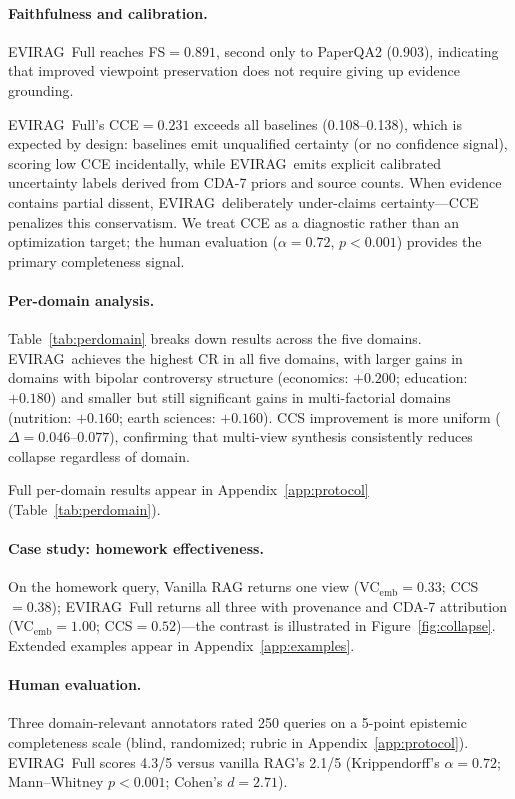 \documentclass[11pt]{article}
\newcommand{\system}{\textsc{EVIRAG}\xspace}
\begin{document}
\paragraph{Faithfulness and calibration.}
\system\ Full reaches FS$=0.891$, second only to PaperQA2 (0.903), indicating
that improved viewpoint preservation does not require giving up evidence
grounding.

\system\ Full's CCE$=0.231$ exceeds all baselines (0.108--0.138), which is
expected by design: baselines emit unqualified certainty (or no confidence
signal), scoring low CCE incidentally, while \system\ emits explicit calibrated
uncertainty labels derived from CDA-7 priors and source counts.  When evidence
contains partial dissent, \system\ deliberately under-claims certainty---CCE
penalizes this conservatism.  We treat CCE as a diagnostic rather than an
optimization target; the human evaluation ($\alpha{=}0.72$, $p{<}0.001$)
provides the primary completeness signal.

\paragraph{Per-domain analysis.}
Table~\ref{tab:perdomain} breaks down results across the five domains.
\system\ achieves the highest CR in all five domains, with larger gains in
domains with bipolar controversy structure (economics: $+0.200$;
education: $+0.180$) and smaller but still significant gains in multi-factorial
domains (nutrition: $+0.160$; earth sciences: $+0.160$).  CCS improvement is
more uniform ($\Delta{=}0.046$--$0.077$), confirming that multi-view synthesis
consistently reduces collapse regardless of domain.

Full per-domain results appear in Appendix~\ref{app:protocol}
(Table~\ref{tab:perdomain}).

\paragraph{Case study: homework effectiveness.}
On the homework query, Vanilla RAG returns one view
(VC$_\text{emb}{=}0.33$; CCS$=0.38$); \system\ Full returns all three with
provenance and CDA-7 attribution (VC$_\text{emb}{=}1.00$; CCS$=0.52$)---the
contrast is illustrated in Figure~\ref{fig:collapse}.
Extended examples appear in Appendix~\ref{app:examples}.

\paragraph{Human evaluation.}
Three domain-relevant annotators rated 250 queries on a 5-point epistemic
completeness scale (blind, randomized; rubric in Appendix~\ref{app:protocol}).
\system\ Full scores 4.3/5 versus vanilla RAG's 2.1/5
(Krippendorff's $\alpha{=}0.72$; Mann--Whitney $p{<}0.001$;
Cohen's $d{=}2.71$).
\end{document}
